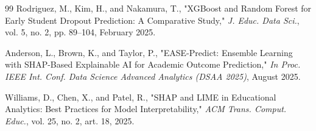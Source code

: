 \documentclass[conference]{IEEEtran}
\begin{document}
\begin{thebibliography}{99}
 Rodriguez, M., Kim, H., and Nakamura, T., "XGBoost and Random Forest for Early Student Dropout Prediction: A Comparative Study," \textit{J. Educ. Data Sci.}, vol. 5, no. 2, pp. 89--104, February 2025.

 Anderson, L., Brown, K., and Taylor, P., "EASE-Predict: Ensemble Learning with SHAP-Based Explainable AI for Academic Outcome Prediction," \textit{In Proc. IEEE Int. Conf. Data Science Advanced Analytics (DSAA 2025)}, August 2025.

 Williams, D., Chen, X., and Patel, R., "SHAP and LIME in Educational Analytics: Best Practices for Model Interpretability," \textit{ACM Trans. Comput. Educ.}, vol. 25, no. 2, art. 18, 2025.

\end{thebibliography}
\end{document}
